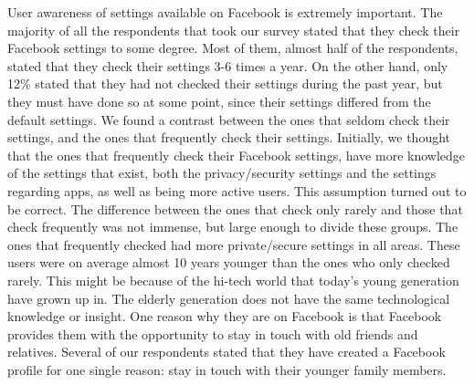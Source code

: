 User awareness of settings available on Facebook is extremely important. The majority of all the respondents that took our survey stated that they check their Facebook settings to some degree. Most of them, almost half of the respondents, stated that they check their settings 3-6 times a year. On the other hand, only 12\% stated that they had not checked their settings during the past year, but they must have done so at some point, since their settings differed from the default settings. We found a contrast between the ones that seldom check their settings, and the ones that frequently check their settings. Initially, we 
thought that the ones that frequently check their Facebook settings, have more knowledge of the settings that exist, both the privacy/security settings and the settings regarding apps, as well as being more active users. This assumption turned out to be correct. The difference between the ones that check only rarely and those that check frequently was not immense, but large enough to divide these groups. The ones that frequently checked had more private/secure settings in all areas. These users were on average almost 10 years younger than the ones who only checked rarely. This might be because of the hi-tech world that today's young generation have grown up in. The elderly generation does not have the same technological knowledge or insight. One reason why they are on Facebook is that Facebook provides them with the opportunity to stay in touch with old friends and relatives. Several of our respondents stated that they have created a Facebook profile for one single reason: stay in touch with their younger family members. 

